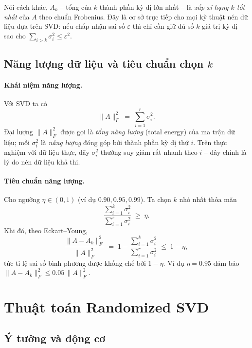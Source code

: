 Nói cách khác, $A_k$ -- tổng của $k$ thành phần kỳ dị lớn nhất -- là
\emph{xấp xỉ hạng-$k$ tốt nhất} của $A$ theo chuẩn Frobenius. Đây là cơ sở
trực tiếp cho mọi kỹ thuật nén dữ liệu dựa trên SVD: nếu chấp nhận sai số
$\varepsilon$ thì chỉ cần giữ đủ số $k$ giá trị kỳ dị sao cho
$\sum_{i>k}\sigma_i^2 \le \varepsilon^2$.

\subsection{Năng lượng dữ liệu và tiêu chuẩn chọn $k$}

\paragraph{Khái niệm năng lượng.}
Với SVD ta có
\[
\|A\|_F^2 \;=\; \sum_{i=1}^{r}\sigma_i^2.
\]
Đại lượng $\|A\|_F^2$ được gọi là \emph{tổng năng lượng} (total energy) của
ma trận dữ liệu; mỗi $\sigma_i^2$ là \emph{năng lượng} đóng góp bởi thành phần
kỳ dị thứ $i$. Trên thực nghiệm với dữ liệu thực, dãy $\sigma_i^2$ thường suy
giảm rất nhanh theo $i$ -- đây chính là lý do nén dữ liệu khả thi.

\paragraph{Tiêu chuẩn năng lượng.}
Cho ngưỡng $\eta \in (0,1)$ (ví dụ $0.90, 0.95, 0.99$). Ta chọn $k$ nhỏ nhất
thỏa mãn
\begin{equation}\label{eq:energy-criterion}
\frac{\sum_{i=1}^{k}\sigma_i^2}{\sum_{i=1}^{r}\sigma_i^2} \;\ge\; \eta.
\end{equation}
Khi đó, theo Eckart--Young,
\[
\frac{\|A-A_k\|_F^2}{\|A\|_F^2} \;=\; 1 - \frac{\sum_{i=1}^{k}\sigma_i^2}{\sum_{i=1}^{r}\sigma_i^2} \;\le\; 1-\eta,
\]
tức tỉ lệ sai số bình phương được khống chế bởi $1-\eta$. Ví dụ $\eta=0.95$
đảm bảo $\|A-A_k\|_F^2 \le 0.05\,\|A\|_F^2$.


\section{Thuật toán Randomized SVD}

\subsection{Ý tưởng và động cơ}

